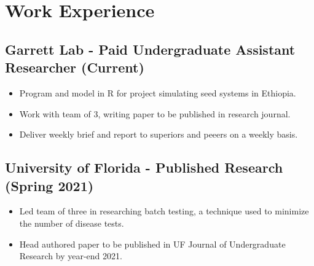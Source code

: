 \documentclass{article}
\newenvironment{CustomItemize}
{ \begin{itemize}[leftmargin=1em]
    \setlength{\itemsep}{0pt}
    \setlength{\parskip}{0pt}
    \setlength{\parindent}{0pt}
    \setlength{\parsep}{0pt}     }
{ \end{itemize}                  }
\begin{document}

\vspace{.25em}

\section{Work Experience}

\subsection{Garrett Lab - Paid Undergraduate Assistant Researcher (Current)}
\begin{CustomItemize}
\item Program and model in R for project simulating seed systems in Ethiopia.
\item Work with team of 3, writing paper to be published in research journal.
\item Deliver weekly brief and report to superiors and peeers on a weekly basis.
\end{CustomItemize}

\subsection{University of Florida - Published Research (Spring 2021)}
\begin{CustomItemize}
\item Led team of three in researching batch testing, a technique used to minimize the number of disease tests.
\item Head authored paper to be published in UF Journal of Undergraduate Research by year-end 2021.
\end{CustomItemize}
\end{document}
